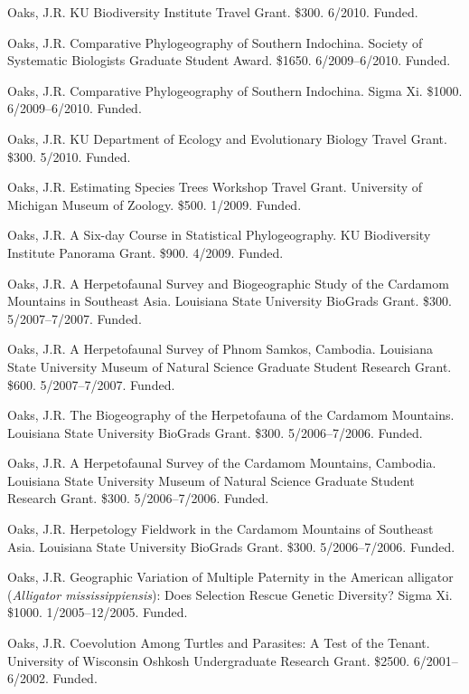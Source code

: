 \documentclass[10pt]{article}
\newcommand{\ignore}[1]{}
\newcommand{\myHangIndent}{\hangindent=5mm}
\begin{document}
\myHangIndent
Oaks, J.R.
KU Biodiversity Institute Travel Grant.
\$300.
6/2010.
Funded.

\myHangIndent
Oaks, J.R.
Comparative Phylogeography of Southern Indochina.
Society of Systematic Biologists Graduate Student Award.
\$1650.
6/2009--6/2010.
Funded.

\myHangIndent
Oaks, J.R.
Comparative Phylogeography of Southern Indochina.
Sigma Xi.
\$1000.
6/2009--6/2010.
Funded.

\ignore{
\myHangIndent
Oaks, J.R.
Comparative Phylogeography of Southern Indochina.
The Society for the Study of Amphibians and Reptiles Dean E. Metter Award.
\$800.
6/2009--6/2010.
Not funded.
}
\myHangIndent
Oaks, J.R.
KU Department of Ecology and Evolutionary Biology Travel Grant.
\$300.
5/2010.
Funded.

\myHangIndent
Oaks, J.R.
Estimating Species Trees Workshop Travel Grant.
University of Michigan Museum of Zoology.
\$500.
1/2009.
Funded.

\myHangIndent
Oaks, J.R.
A Six-day Course in Statistical Phylogeography.
KU Biodiversity Institute Panorama Grant.
\$900.
4/2009.
Funded.

\myHangIndent
Oaks, J.R.
A Herpetofaunal Survey and Biogeographic Study of the Cardamom Mountains in
Southeast Asia.
Louisiana State University BioGrads Grant.
\$300.
5/2007--7/2007.
Funded.

\myHangIndent
Oaks, J.R.
A Herpetofaunal Survey of Phnom Samkos, Cambodia.
Louisiana State University Museum of Natural Science Graduate Student Research
Grant.
\$600.
5/2007--7/2007.
Funded.

\myHangIndent
Oaks, J.R.
The Biogeography of the Herpetofauna of the Cardamom Mountains.
Louisiana State University BioGrads Grant.
\$300.
5/2006--7/2006.
Funded.

\myHangIndent
Oaks, J.R.
A Herpetofaunal Survey of the Cardamom Mountains, Cambodia.
Louisiana State University Museum of Natural Science Graduate Student Research
Grant.
\$300.
5/2006--7/2006.
Funded.

\myHangIndent
Oaks, J.R.
Herpetology Fieldwork in the Cardamom Mountains of Southeast Asia.
Louisiana State University BioGrads Grant.
\$300.
5/2006--7/2006.
Funded.

\myHangIndent
Oaks, J.R.
Geographic Variation of Multiple Paternity in the American alligator
(\emph{Alligator mississippiensis}): Does Selection Rescue Genetic Diversity?
Sigma Xi.
\$1000.
1/2005--12/2005.
Funded.

\myHangIndent
Oaks, J.R.
Coevolution Among Turtles and Parasites: A Test of the Tenant.
University of Wisconsin Oshkosh Undergraduate Research Grant.
\$2500.
6/2001--6/2002.
Funded.
\end{document}
